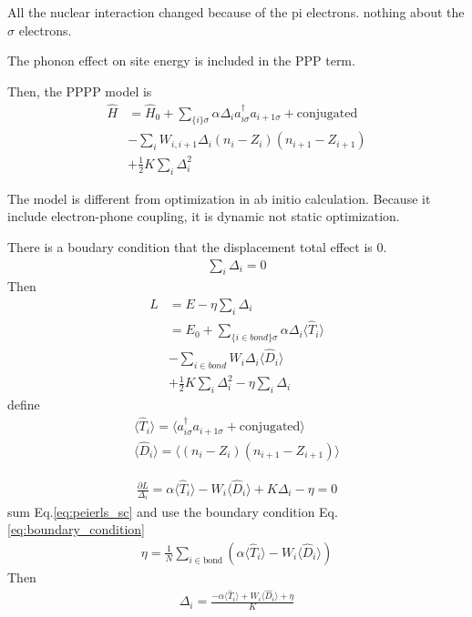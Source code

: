 \documentclass[a4paper,11pt]{article}
\begin{document}
    All the nuclear interaction changed because of the pi electrons. nothing
    about the $\sigma$ electrons.

    The phonon effect on site energy is included in the PPP term.

    Then, the PPPP model is
    \begin{align}
        \hat{H} & = \hat{H}_0 %
        +  \sum_{\{i\}\sigma} \alpha \Delta_i a_{i\sigma}^\dagger a_{i+1\sigma} %
        + \textrm{conjugated} \nonumber \\
        &  - \sum_{i} W_{i,i+1} \Delta_i (n_i-Z_i) (n_{i+1}-Z_{i+1}) \nonumber \\
        &  +\frac{1}{2} K \sum_{i} \Delta_i^2
    \end{align}

    The model is different from optimization in ab initio calculation. Because
    it include electron-phone coupling, it is dynamic not static optimization.

    There is a boudary condition that the displacement total effect is 0.
    \begin{gather}
        \sum_{i} \Delta_i=0 \label{eq:boundary_condition}
    \end{gather}
    Then
    \begin{align}
        L & = E-\eta\sum_{i} \Delta_i \nonumber \\
          & = E_0 +  \sum_{\{i \in bond \}\sigma} \alpha \Delta_i \langle %
        \hat{T}_i \rangle \\ \nonumber
        &  - \sum_{i \in bond } W_{i} \Delta_i  \langle \hat{D}_i \rangle \nonumber \\
        &  +\frac{1}{2} K \sum_{i} \Delta_i^2 -\eta\sum_{i} \Delta_i \nonumber
    \end{align}
    define
    \begin{gather}
        \langle \hat{T}_i \rangle = \langle a_{i\sigma}^\dagger a_{i+1\sigma} + \textrm{conjugated} \rangle\\
        \langle \hat{D}_i \rangle = \langle (n_i-Z_i) (n_{i+1}-Z_{i+1}) \rangle
    \end{gather}

    \begin{gather}
        \frac{\partial{L}}{\Delta_i}= \alpha \langle \hat{T}_i \rangle - W_i %
        \langle \hat{D}_i \rangle + K \Delta_i -\eta = 0 \label{eq:peierls_sc} 
    \end{gather}
    sum Eq.\eqref{eq:peierls_sc} and use the boundary condition
    Eq.\eqref{eq:boundary_condition}
    \begin{gather}
        \eta=\frac{1}{N} \sum_{i \in \textrm{bond} }( \alpha \langle \hat{T}_i \rangle - W_i \langle %
        \hat{D}_i \rangle )
    \end{gather}
    Then
    \begin{gather}
        \Delta_i = \frac {- \alpha \langle \hat{T}_i \rangle + W_i \langle %
        \hat{D}_i \rangle +\eta} {K} \label{eq:delta_i}
    \end{gather} 
\end{document}
